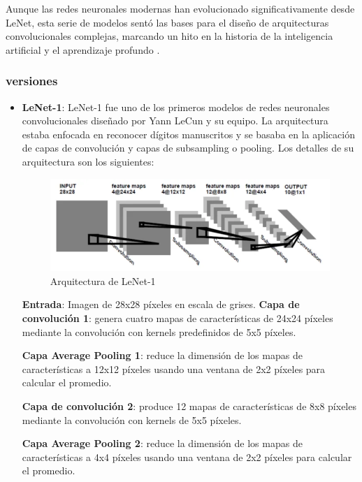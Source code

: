 Aunque las redes neuronales modernas han evolucionado significativamente 
desde LeNet, esta serie de modelos sentó las bases para el diseño de 
arquitecturas convolucionales complejas, marcando un hito en la historia 
de la inteligencia artificial y el aprendizaje profundo \cite{lenet_history_geeks} \cite{lenet_neha}.

\subsubsection{versiones}

\begin{itemize}
    \item \textbf{LeNet-1}: 
    LeNet-1 fue uno de los primeros modelos de redes neuronales 
    convolucionales diseñado por Yann LeCun y su equipo. 
    La arquitectura estaba enfocada en reconocer dígitos manuscritos 
    y se basaba en la aplicación de capas de convolución y capas de 
    subsampling o pooling. Los detalles de su arquitectura son los 
    siguientes:

    \begin{figure}[htbp]
        \centering
        \includegraphics[width=\linewidth]{src/figures/lenet_1.png}
        \caption{Arquitectura de LeNet-1 \cite{Lenet_1}}
        \label{fig:lenet-1}
    \end{figure}

    \textbf{Entrada}: Imagen de 28x28 píxeles en escala de grises.  
    \textbf{Capa de convolución 1}: genera cuatro mapas de características
    de 24x24 píxeles mediante la convolución con kernels predefinidos de 5x5 píxeles.

    \textbf{Capa Average Pooling 1}: reduce la dimensión de los mapas de características
    a 12x12 píxeles usando una ventana de 2x2 píxeles para calcular el promedio.

    \textbf{Capa de convolución 2}: produce 12 mapas de características 
    de 8x8 píxeles mediante la convolución con kernels de 5x5 píxeles.

    \textbf{Capa Average Pooling 2}: reduce la dimensión de los mapas de 
    características a 4x4 píxeles usando una ventana de 2x2 píxeles 
    para calcular el promedio.


\end{itemize}

